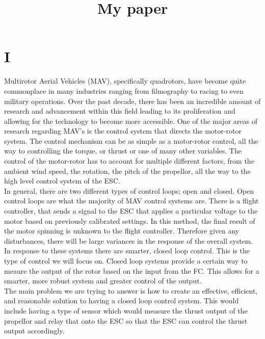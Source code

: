 \documentclass[twocolumn]{article}
\begin{document}
	\title{\begin{titlepage}
		My paper
	\end{titlepage}}

	\section{I}
	
	Multirotor Aerial Vehicles (MAV), specifically quadrotors, have become quite commonplace in many industries ranging from filmography to racing to even military operations. Over the past decade, there has been an incredible amount of research and advancement within this field leading to its proliferation and allowing for the technology to become more accessible. One of the major areas of research regarding MAV's is the control system that directs the motor-rotor system. The control mechanism can be as simple as a motor-rotor control, all the way to controlling the torque, or thrust or one of many other variables. The control of the motor-rotor has to account for multiple different factors, from the ambient wind speed, the rotation, the pitch of the propellor, all the way to the high level control system of the ESC. \\
	
	
	In general, there are two different types of control loops; open and closed. Open control loops are what the majority of MAV control systems are. There is a flight controller, that sends a signal to the ESC that applies a particular voltage to the motor based on previously calibrated settings. In this method, the final result of the motor spinning is unknown to the flight controller. Therefore given any disturbances, there will be large variances in the response of the overall system. In response to these systems there are smarter, closed loop control. This is the type of control we will focus on. Closed loop systems provide a certain way to meaure the output of the rotor based on the input from the FC. This allows for a smarter, more robust system and greater control of the output. \\
	
	The main problem we are trying to answer is how to create an effective, efficient, and reasonable solution to having a closed loop control system. This would include having a type of sensor which would measure the thrust output of the propellor and relay that onto the ESC so that the ESC can control the thrust output accordingly.
	
\end{document}
